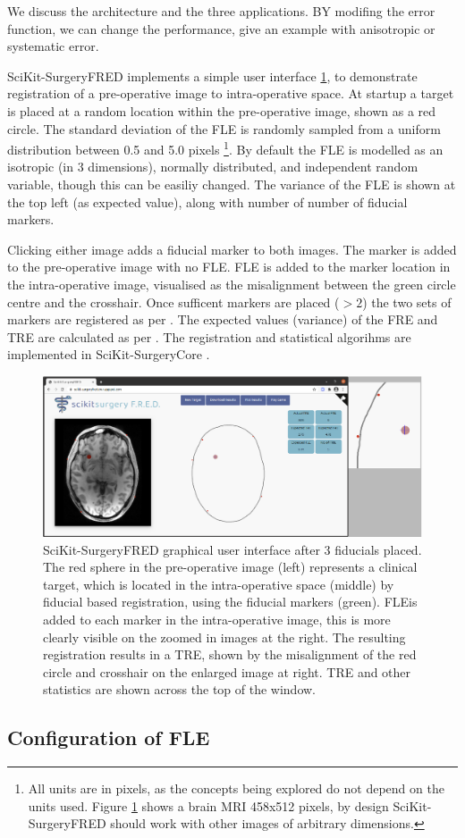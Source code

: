 We discuss the architecture and the three applications. BY modifing the error function, we can change the performance, give an example with anisotropic or systematic error.

SciKit-SurgeryFRED implements a simple user interface \ref{fig:surgery_fred}, to demonstrate registration of a pre-operative image to intra-operative space. At startup a target is placed at a random location within the pre-operative image, shown as a red circle. The standard deviation of the \gls{FLE} is randomly sampled from a uniform distribution 
between 0.5 and 5.0 pixels \footnote{All units are in pixels, as the concepts being explored do not depend on the units used. Figure \ref{fig:surgery_fred} shows a brain MRI 458x512 pixels, by design SciKit-SurgeryFRED should work with other images of arbitrary dimensions.}. By default the \gls{FLE} is modelled as an isotropic (in 3 dimensions), normally distributed, and independent random variable, though this can be easiliy changed. The variance of the \gls{FLE} is shown at the top left (as expected value), along with number of number of fiducial markers. 

Clicking either image adds a fiducial marker to both images. The marker is added to the pre-operative image with no \gls{FLE}. \gls{FLE} is added to the marker location in the intra-operative image, visualised as the misalignment between the green circle centre and the crosshair. Once sufficent markers are placed ($>2$) the two sets of markers are registered as per \cite{Arun1987}. The expected values (variance) of the \gls{FRE} and \gls{TRE} are calculated 
as per \cite{Fitzpatrick1998}. The registration and statistical algorihms are implemented in SciKit-SurgeryCore \cite{matt_clarkson_2020_3965731}.

\cite{matt_clarkson_2020_3965731}

\begin{figure}
	\begin{center}
	\includegraphics[width=0.9\linewidth]{scikit-surgeryfred_gui.eps}
		\caption{\label{fig:surgery_fred}SciKit-SurgeryFRED graphical user interface after 3 fiducials placed. The red sphere in the pre-operative image (left) represents a clinical target, which is located in the
		intra-operative space (middle) by fiducial based registration, using the fiducial markers (green). FLEis added to each marker in the intra-operative image, this is more clearly visible on the zoomed in images at the right. The resulting registration results in a TRE, shown by the misalignment of the red circle and crosshair 
		on the enlarged image at right. TRE and other statistics are shown across the top
		of the window.}
	\end{center}
\end{figure}


\subsection{Configuration of FLE}
